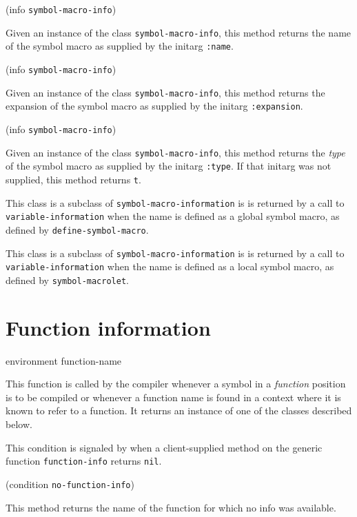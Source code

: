  {(info {\tt symbol-macro-info})}

Given an instance of the class \texttt{symbol-macro-info}, this method
returns the name of the symbol macro as supplied by the initarg
\texttt{:name}.

 {(info {\tt symbol-macro-info})}

Given an instance of the class \texttt{symbol-macro-info}, this method
returns the expansion of the symbol macro as supplied by the initarg
\texttt{:expansion}.

 {(info {\tt symbol-macro-info})}

Given an instance of the class \texttt{symbol-macro-info}, this method
returns the \emph{type} of the symbol macro as supplied by the initarg
\texttt{:type}.  If that initarg was not supplied, this method returns
\texttt{t}.


This class is a subclass of \texttt{symbol-macro-information} is is
returned by a call to \texttt{variable-information} when the name is
defined as a global symbol macro, as defined by
\texttt{define-symbol-macro}.


This class is a subclass of \texttt{symbol-macro-information} is is
returned by a call to \texttt{variable-information} when the name is
defined as a local symbol macro, as defined by
\texttt{symbol-macrolet}.

\section{Function information}

 {environment function-name}

This function is called by the compiler whenever a symbol in a
\emph{function} position is to be compiled or whenever a function name
is found in a context where it is known to refer to a function.  It
returns an instance of one of the classes described below.


This condition is signaled by \sysname{} when a client-supplied method
on the generic function \texttt{function-info} returns \texttt{nil}.

 {(condition {\tt no-function-info})}

This method returns the name of the function for which no info was
available. 

